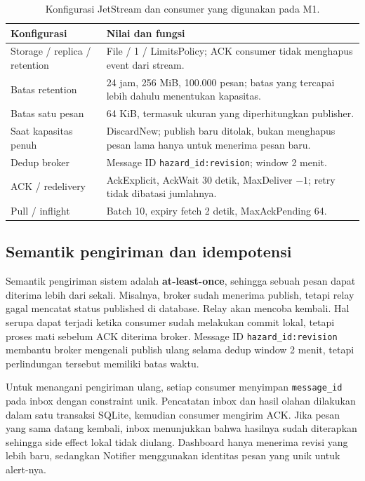 \begin{table}[H]
\centering\small
\begin{tabularx}{\textwidth}{>{\raggedright\arraybackslash}p{4.8cm}Y}
\toprule
Konfigurasi & Nilai dan fungsi \\
\midrule
Storage / replica / retention & File / 1 / LimitsPolicy; ACK consumer tidak menghapus event dari stream. \\
Batas retention & 24 jam, 256 MiB, 100.000 pesan; batas yang tercapai lebih dahulu menentukan kapasitas. \\
Batas satu pesan & 64 KiB, termasuk ukuran yang diperhitungkan publisher. \\
Saat kapasitas penuh & DiscardNew; publish baru ditolak, bukan menghapus pesan lama hanya untuk menerima pesan baru. \\
Dedup broker & Message ID \texttt{hazard\_id:revision}; window 2 menit. \\
ACK / redelivery & AckExplicit, AckWait 30 detik, MaxDeliver $-1$; retry tidak dibatasi jumlahnya. \\
Pull / inflight & Batch 10, expiry fetch 2 detik, MaxAckPending 64. \\
\bottomrule
\end{tabularx}
\caption{Konfigurasi JetStream dan consumer yang digunakan pada M1.}
\end{table}

\subsection{Semantik pengiriman dan idempotensi}
Semantik pengiriman sistem adalah \textbf{at-least-once}, sehingga sebuah pesan dapat diterima lebih dari sekali. Misalnya, broker sudah menerima publish, tetapi relay gagal mencatat status published di database. Relay akan mencoba kembali. Hal serupa dapat terjadi ketika consumer sudah melakukan commit lokal, tetapi proses mati sebelum ACK diterima broker. Message ID \texttt{hazard\_id:revision} membantu broker mengenali publish ulang selama dedup window 2 menit, tetapi perlindungan tersebut memiliki batas waktu.

Untuk menangani pengiriman ulang, setiap consumer menyimpan \texttt{message\_id} pada inbox dengan constraint unik. Pencatatan inbox dan hasil olahan dilakukan dalam satu transaksi SQLite, kemudian consumer mengirim ACK. Jika pesan yang sama datang kembali, inbox menunjukkan bahwa hasilnya sudah diterapkan sehingga side effect lokal tidak diulang. Dashboard hanya menerima revisi yang lebih baru, sedangkan Notifier menggunakan identitas pesan yang unik untuk alert-nya.

